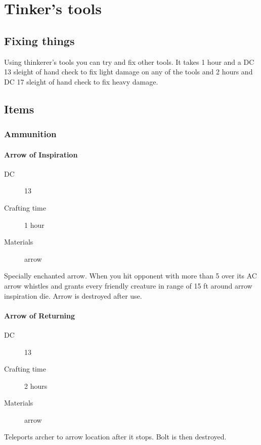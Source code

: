 \chapter{Tinker's tools}

\section{Fixing things}

Using thinkerer's tools you can try and fix other tools. It takes 1 hour and a DC 13 sleight of hand check to fix light damage on any of the tools and 2 hours and DC 17 sleight of hand check to fix heavy damage.

\section{Items}

\subsection{Ammunition}

\subsubsection{Arrow of Inspiration}

\begin{description}
\item [DC] 13 \arcana
\item [Crafting time] 1 hour
\item [Materials] arrow
\end{description}

Specially enchanted arrow. When you hit opponent with more than 5 over its AC arrow whistles and grants every friendly creature in range of 15 ft around arrow  inspiration die. Arrow is destroyed after use.

\subsubsection{Arrow of Returning}

\begin{description}
\item [DC] 13 \arcana
\item [Crafting time] 2 hours
\item [Materials] arrow
\end{description}

Teleports archer to arrow location after it stops. Bolt is then destroyed.

